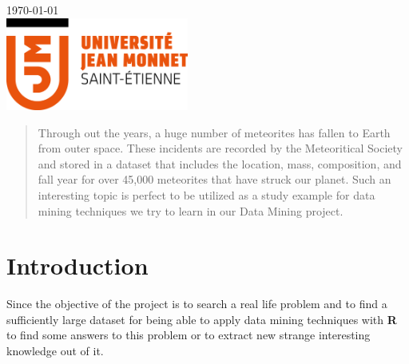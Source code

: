 \begin{titlepage}

{\large \today}\\[2cm] %


\includegraphics[width=60mm]{logo.png}\\[1cm] %
 

\vfill %

\end{titlepage}


\begin{abstract}
Through out the years, a huge number of meteorites has fallen to Earth from outer space. These incidents are recorded by the Meteoritical Society and stored in a dataset that includes the location, mass, composition, and fall year for over 45,000 meteorites that have struck our planet. Such an interesting topic is perfect to be utilized as a study example for data mining techniques we try to learn in our Data Mining project.
\end{abstract}

\section{Introduction}

Since the objective of the project is to search a real life problem and to find a sufficiently large dataset for being able to apply data mining techniques with \textbf{R} to find some answers to this problem or to extract new strange interesting knowledge out of it. 

